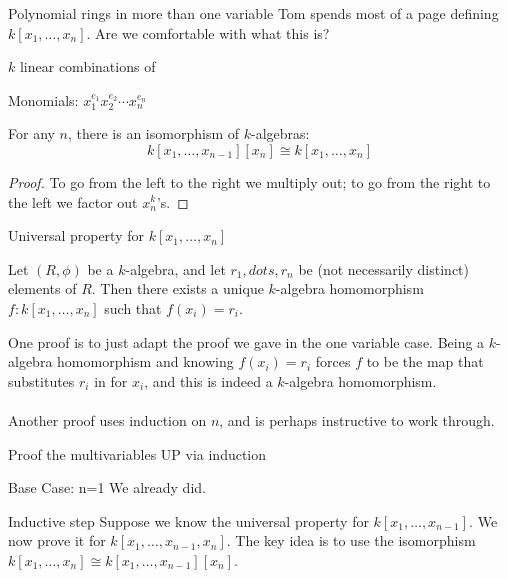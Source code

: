 \documentclass{beamer}
\begin{document}
\begin{frame}{Polynomial rings in more than one variable}
Tom spends most of a page defining $k[x_1,\dots, x_n]$.  Are we comfortable with what this is?

$k$ linear combinations of 

Monomials: $x_1^{e_1}x_2^{e_2}\cdots x_n^{e_n}$



\end{frame}



\begin{frame}

\begin{lemma} For any $n$, there is an isomorphism of $k$-algebras:
$$k[x_1,\dots,x_{n-1}][x_n]\cong k[x_1,\dots, x_n]$$
\end{lemma}
\begin{proof}
To go from the left to the right we multiply out; to go from the right to the left we factor out $x_n^k$'s.
\end{proof}

\end{frame}





\begin{frame}{Universal property for $k[x_1,\dots, x_n]$}

\begin{lemma} Let $(R,\phi)$ be a $k$-algebra, and let $r_1,dots, r_n$ be (not necessarily distinct) elements of $R$.  Then there exists a unique $k$-algebra homomorphism $f:k[x_1,\dots, x_n]$ such that $f(x_i)=r_i$.
\end{lemma}

One proof is to just adapt the proof we gave in the one variable case.  Being a $k$-algebra homomorphism and knowing $f(x_i)=r_i$ forces $f$ to be the map that substitutes $r_i$ in for $x_i$, and this is indeed a $k$-algebra homomorphism. 
\\~\\ 

Another proof uses induction on $n$, and is perhaps instructive to work through.

\end{frame}

\begin{frame}{Proof the multivariables UP via induction}

\begin{block}{Base Case: n=1}
We already did.
\end{block}

\begin{block}{Inductive step}
Suppose we know the universal property for $k[x_1,\dots, x_{n-1}]$.  We now prove it for $k[x_1,\dots, x_{n-1},x_n]$.  The key idea is to use the isomorphism $k[x_1,\dots, x_n]\cong k[x_1,\dots, x_{n-1}][x_n]$.

\end{block}
\end{frame}
\end{document}
